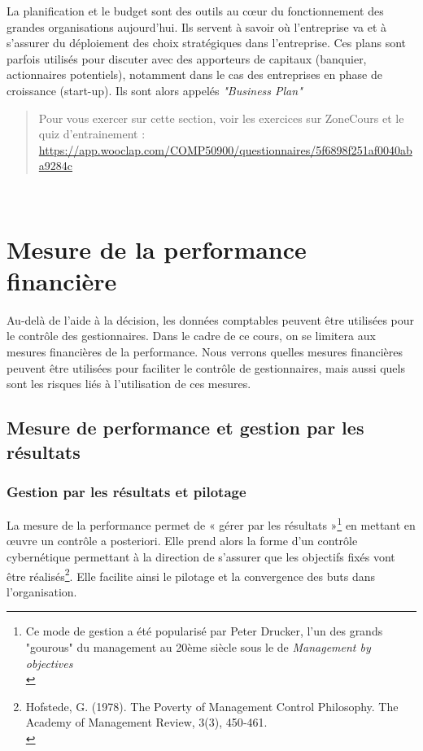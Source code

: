 \documentclass{kaobook}
\begin{document}
La planification et le budget sont des outils au cœur du fonctionnement des grandes organisations aujourd'hui. Ils servent à savoir où l'entreprise va et à s'assurer du déploiement des choix stratégiques dans l'entreprise. Ces plans sont parfois utilisés pour discuter avec des apporteurs de capitaux (banquier, actionnaires potentiels), notamment dans le cas des entreprises en phase de croissance (start-up). Ils sont alors appelés \emph{"Business Plan"}\\

\begin{quote}
Pour vous exercer sur cette section, voir les exercices sur ZoneCours et le quiz d'entrainement : \url{https://app.wooclap.com/COMP50900/questionnaires/5f6898f251af0040aba9284c}\\
\end{quote}

\clearpage\\
\chapter{Mesure de la performance financière}
\label{sec:org3790548}
Au-delà de l'aide à la décision, les données comptables peuvent être utilisées pour le contrôle des gestionnaires. Dans le cadre de ce cours, on se limitera aux mesures financières de la performance. Nous verrons quelles mesures financières peuvent être utilisées pour faciliter le contrôle de gestionnaires, mais aussi quels sont les risques liés à l'utilisation de ces mesures.\\
\section{Mesure de performance et gestion par les résultats}
\label{sec:org0ab0866}
\subsection{Gestion par les résultats et pilotage}
\label{sec:org41339e8}
La mesure de la performance permet de « gérer par les résultats »\footnote{Ce mode de gestion a été popularisé par Peter Drucker, l'un des grands "gourous" du management au 20ème siècle sous le de \emph{Management by objectives}\\} en mettant en œuvre un contrôle a posteriori. Elle prend alors la forme d’un contrôle cybernétique permettant à la direction de s’assurer que les objectifs fixés vont être réalisés\footnote{Hofstede, G. (1978). The Poverty of Management Control Philosophy. The Academy of Management Review, 3(3), 450‑461.\\}. Elle facilite ainsi le pilotage et la convergence des buts dans l’organisation.\\
\end{document}
